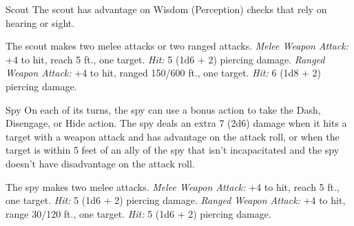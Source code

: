 \documentclass[10pt,a4paper,twoside,twocolumn,openany,bg=print,nodeprecatedcode]{dndbook}
\begin{document}
\begin{DndMonster}[float*=t]{Scout}
\DndMonsterBasics[
armor-class = {13 (leather armor)},
hit-points = {\DndDice{3d8 + 3}},
speed = {30 ft.}
]
\DndMonsterAbilityScores[
 str = 11,
 dex = 14,
 con = 12,
 int = 11,
 wis = 13,
 cha = 11
]
\DndMonsterDetails[
skills = {Nature +4, Perception +5, Stealth +6, Survival +5},
languages = {any one language (usually Common)},
challenge = 1/2,
]
The scout has advantage on Wisdom (Perception) checks that rely on hearing or sight.
\par
{}
The scout makes two melee attacks or two ranged attacks.
\textsl{Melee Weapon Attack:} +4 to hit, reach 5 ft., one target. \textsl{Hit:} 5 (1d6 + 2) piercing damage.
\textsl{Ranged Weapon Attack:} +4 to hit, ranged 150/600 ft., one target. \textsl{Hit:} 6 (1d8 + 2) piercing damage.
\end{DndMonster}


\clearpage

\begin{DndMonster}[float*=t]{Spy}
\DndMonsterBasics[
armor-class = {12},
hit-points = {\DndDice{6d8}},
speed = {30 ft.}
]
\DndMonsterAbilityScores[
 str = 10,
 dex = 15,
 con = 10,
 int = 12,
 wis = 14,
 cha = 16
]
\DndMonsterDetails[
skills = {Deception +5, Insight +4, Investigation +5, Perception +6, Persuasion +5, Sleight Of Hand +4, Stealth +4},
languages = {any two languages},
challenge = 1,
]
On each of its turns, the spy can use a bonus action to take the Dash, Disengage, or Hide action.
The spy deals an extra 7 (2d6) damage when it hits a target with a weapon attack and has advantage on the attack roll, or when the target is within 5 feet of an ally of the spy that isn't incapacitated and the spy doesn't have disadvantage on the attack roll.
\par
{}
The spy makes two melee attacks.
\textsl{Melee Weapon Attack:} +4 to hit, reach 5 ft., one target. \textsl{Hit:} 5 (1d6 + 2) piercing damage.
\textsl{Ranged Weapon Attack:} +4 to hit, range 30/120 ft., one target. \textsl{Hit:} 5 (1d6 + 2) piercing damage.
\end{DndMonster}
\end{document}
